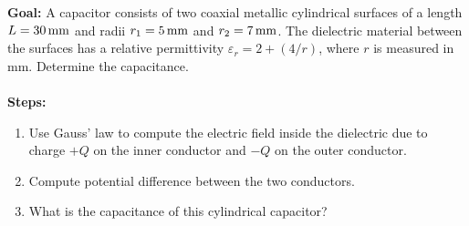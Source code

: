 \documentclass[../../header.tex]{subfiles}
\begin{document}
\textbf{Goal:} A capacitor consists of two coaxial metallic cylindrical surfaces of a length $L = 30\,\text{mm}$ and radii $r_1 = 5\,\text{mm}$ and $r_2 = 7\,\text{mm}$. The dielectric material between the surfaces has a relative permittivity $\varepsilon_{r} = 2 + (4/r)$, where $r$ is measured in mm. Determine the capacitance.\\
\\
\textbf{Steps:} 

\begin{enumerate}
\item Use Gauss' law to compute the electric field inside the dielectric due to charge $+Q$ on the inner conductor and $-Q$ on the outer conductor.


\item Compute potential difference between the two conductors.


\item What is the capacitance of this cylindrical capacitor?

\end{enumerate}
\end{document}
